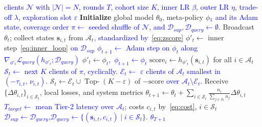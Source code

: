 \documentclass[journal]{IEEEtran}
\theoremstyle{remark}
\newcommand{\revision}[1]{#1}
\newcommand{\revtwo}[1]{\textcolor{blue}{#1}}
\begin{document}
\begin{algorithm}[!t]
	\vspace{0.5mm}
	\caption{\small MAML-Select Algorithm}
	\label{alg:maml_select}
	\begin{algorithmic}[1]
		\scriptsize
		\Require \revtwo{clients $\mathcal{N}$ with $|\mathcal{N}|=N$, rounds $T$, cohort size $K$, inner LR $\beta$, outer LR $\eta$, trade-off $\lambda$, exploration slot $\varepsilon$}
		\State \textbf{Initialize} global model $\theta_0$, meta-policy $\phi$\revtwo{$_1$ and its Adam state}, \revtwo{coverage order $\pi\leftarrow$ seeded shuffle of $\mathcal{N}$}, \revtwo{and $\mathcal{D}_{sup},\mathcal{D}_{query}\leftarrow\emptyset$}.
		\State Broadcast $\theta_t$; collect states $\bm{s}_{i,t}$ from $\mathcal{A}_t$\revtwo{, standardized by~\eqref{eq:zscore}}
		\If{\revtwo{$\mathcal{D}_{query}\neq\emptyset$}}
		\State \revision{$\phi'_t\leftarrow$ inner step~\eqref{eq:inner_loop}} \revtwo{on $\mathcal{D}_{sup}$} 
			\State \revtwo{$\phi_{t+1}\leftarrow$ Adam step on $\phi_t$ along $\nabla_{\phi'_t}\mathcal{L}_{query}(h_{\phi'_t};\mathcal{D}_{query})$} \Comment{\revtwo{Phase 2}}
		\Else
		\State $\phi'_t \leftarrow \phi_t$\revtwo{,\ $\phi_{t+1}\leftarrow\phi_t$} 
		\EndIf
		\State \revision{$\text{score}_i \leftarrow h_{\phi'_t}(\bm{s}_{i,t})$ for all $i \in \mathcal{A}_t$} 
			\If{\revtwo{$t \le \lceil N/K\rceil$}} \Comment{\revtwo{cold start}}
			\State \revtwo{$\mathcal{S}_t\leftarrow$ next $K$ clients of $\pi$, cyclically.}
			\Else
			\State \revtwo{$\mathcal{E}_t\leftarrow$ $\varepsilon$ clients of $\mathcal{A}_t$ smallest in $(-\tau_{i,t},\,\nu_{i,t})$.} \Comment{\revtwo{exploration}}
			\State \revision{$\mathcal{S}_t \leftarrow \mathcal{E}_t\cup\operatorname{Top-}(K-\varepsilon)$ of $-\text{score}$ \revtwo{over $\mathcal{A}_t\setminus\mathcal{E}_t$}.}
			\EndIf
			\State \revision{Receive $\{\Delta\theta_{i,t}\}_{i \in \mathcal{S}_t}$, local losses, and system metrics}
			\State \revision{$\theta_{t+1} \leftarrow \theta_t + \sum_{i \in \mathcal{S}_t} \frac{n_i}{\sum_{j \in \mathcal{S}_t}n_j}\Delta\theta_{i,t}$}
			\State \revtwo{$T_{target}\leftarrow$ mean Tier-2 latency over $\mathcal{A}_t$;} costs $c_{i,t}$ by~\eqref{eq:cost}, $i \in \revision{\mathcal{S}_t}$
			\State \revtwo{$\mathcal{D}_{sup}\leftarrow\mathcal{D}_{query}$,\quad $\mathcal{D}_{query}\leftarrow\{(\bm{s}_{i,t},c_{i,t})\mid i\in\mathcal{S}_t\}$.}
		\EndFor
		\State \revtwo{\Return $\theta_{T+1}$}
	\end{algorithmic}
\end{algorithm}
\end{document}

